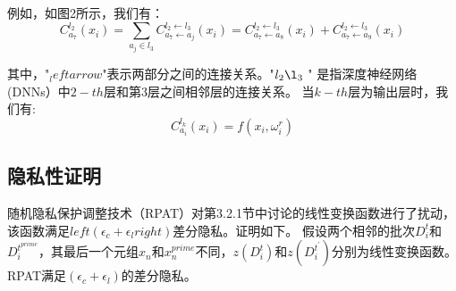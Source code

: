例如，如图2所示，我们有：
$$
C_{a_{7}}^{l_{2}}\left(x_{i}\right)=\sum_{a_{j} \in l_{3}} C_{a_{7} \leftarrow a_{j}}^{l_{2} \leftarrow l_{3}}\left(x_{i}\right)=C_{a_{7} \leftarrow a_{8}}^{l_{2} \leftarrow l_{3}}\left(x_{i}\right)+C_{a_{7} \leftarrow a_{9}}^{l_{2} \leftarrow l_{3}}\left(x_{i}\right)
$$

其中，"$_leftarrow$"表示两部分之间的连接关系。"$l_{2} \l_{3}$ " 是指深度神经网络(DNNs）中$2-t h$层和第3层之间相邻层的连接关系。
当$k-t h$层为输出层时，我们有:
$$
C_{a_{i}}^{l_{k}}\left(x_{i}\right)=f\left(x_{i}, \omega_{i}^{r}\right)
$$

\subsection{隐私性证明}
随机隐私保护调整技术（RPAT）对第3.2.1节中讨论的线性变换函数进行了扰动，该函数满足$left(\epsilon_{c}+\epsilon_{l}right)$差分隐私。证明如下。
假设两个相邻的批次$D_{i}^{t}$和$D_{i}^{t^{prime}}$，其最后一个元组$x_{n}$和$x_{n}^{prime}$不同，$z\left(D_{i}^{t}\right)$和$z\left(D_{i}^{t^{\prime}}\right)$分别为线性变换函数。RPAT满足$\left(\epsilon_{c}+\epsilon_{l}\right)$的差分隐私。

